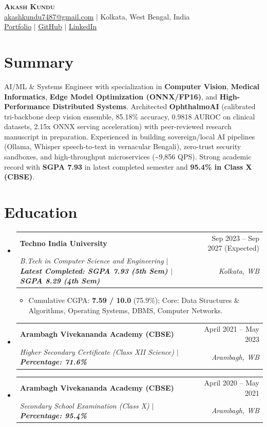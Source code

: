 \documentclass[letterpaper,10pt]{article}
\makeatletter
\newcommand{\resumeItem}[1]{
  \item\small{
    {#1 \vspace{-2pt}}
  }
}
\newcommand{\resumeSubheading}[4]{
  \vspace{-1pt}\item
    \begin{tabular*}{0.97\textwidth}[t]{l@{\extracolsep{\fill}}r}
      \textbf{#1} & #2 \\
      \textit{\small#3} & \textit{\small #4} \\
    \end{tabular*}\vspace{-5pt}
}
\newcommand{\resumeSubHeadingListStart}{\begin{itemize}[leftmargin=0.15in, label={}]}
\newcommand{\resumeSubHeadingListEnd}{\end{itemize}}
\newcommand{\resumeItemListStart}{\begin{itemize}[leftmargin=0.15in]}
\newcommand{\resumeItemListEnd}{\end{itemize}\vspace{-4pt}}
\makeatother
\begin{document}
\begin{center}
    \textbf{\Huge \scshape Akash Kundu} \\ \vspace{2pt}
    \small \href{mailto:akashkundu7487@gmail.com}{akashkundu7487@gmail.com} $|$ Kolkata, West Bengal, India \\ \vspace{1pt}
    \href{https://akashkundu114.github.io}{Portfolio} $|$ \href{https://github.com/AkashKundu114}{GitHub} $|$ \href{https://www.linkedin.com/in/akashkundu114/}{LinkedIn}
\end{center}

\section{Summary}
\vspace{-2pt}
\small{AI/ML \& Systems Engineer with specialization in \textbf{Computer Vision}, \textbf{Medical Informatics}, \textbf{Edge Model Optimization (ONNX/FP16)}, and \textbf{High-Performance Distributed Systems}. Architected \textbf{OphthalmoAI} (calibrated tri-backbone deep vision ensemble, 85.18\% accuracy, 0.9818 AUROC on clinical datasets, 2.15x ONNX serving acceleration) with peer-reviewed research manuscript in preparation. Experienced in building sovereign/local AI pipelines (Ollama, Whisper speech-to-text in vernacular Bengali), zero-trust security sandboxes, and high-throughput microservices (\textasciitilde 9,856 QPS). Strong academic record with \textbf{SGPA 7.93} in latest completed semester and \textbf{95.4\% in Class X (CBSE)}.}
\vspace{-2pt}

\section{Education}
  \resumeSubHeadingListStart
    \resumeSubheading
      {Techno India University}{Sep 2023 -- Sep 2027 (Expected)}
      {B.Tech in Computer Science and Engineering $|$ \textbf{Latest Completed: SGPA 7.93 (5th Sem) $|$ SGPA 8.29 (4th Sem)}}{Kolkata, WB}
      \resumeItemListStart
        \resumeItem{Cumulative CGPA: \textbf{7.59 / 10.0} (75.9\%); Core: Data Structures \& Algorithms, Operating Systems, DBMS, Computer Networks.}
      \resumeItemListEnd
    \resumeSubheading
      {Arambagh Vivekananda Academy (CBSE)}{April 2021 -- May 2023}
      {Higher Secondary Certificate (Class XII Science) $|$ \textbf{Percentage: 71.6\%}}{Arambagh, WB}
    \resumeSubheading
      {Arambagh Vivekananda Academy (CBSE)}{April 2020 -- May 2021}
      {Secondary School Examination (Class X) $|$ \textbf{Percentage: 95.4\%}}{Arambagh, WB}
  \resumeSubHeadingListEnd
\end{document}
